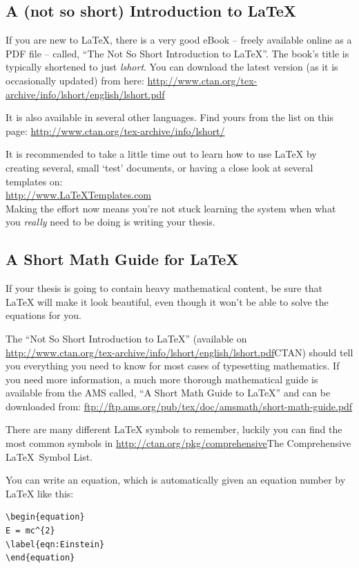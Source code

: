 \subsection{A (not so short) Introduction to \LaTeX{}}

If you are new to \LaTeX{}, there is a very good eBook -- freely available online as a PDF file -- called, \enquote{The Not So Short Introduction to \LaTeX{}}. The book's title is typically shortened to just \emph{lshort}. You can download the latest version (as it is occasionally updated) from here:
\url{http://www.ctan.org/tex-archive/info/lshort/english/lshort.pdf}

It is also available in several other languages. Find yours from the list on this page: \url{http://www.ctan.org/tex-archive/info/lshort/}

It is recommended to take a little time out to learn how to use \LaTeX{} by creating several, small `test' documents, or having a close look at several templates on:\\ 
\url{http://www.LaTeXTemplates.com}\\ 
Making the effort now means you're not stuck learning the system when what you \emph{really} need to be doing is writing your thesis.

\subsection{A Short Math Guide for \LaTeX{}}

If your thesis is going to contain heavy mathematical content, be sure that \LaTeX{} will make it look beautiful, even though it won't be able to solve the equations for you.

The \enquote{Not So Short Introduction to \LaTeX} (available on \url{http://www.ctan.org/tex-archive/info/lshort/english/lshort.pdf}{CTAN}) should tell you everything you need to know for most cases of typesetting mathematics. If you need more information, a much more thorough mathematical guide is available from the AMS called, \enquote{A Short Math Guide to \LaTeX} and can be downloaded from:
\url{ftp://ftp.ams.org/pub/tex/doc/amsmath/short-math-guide.pdf}

There are many different \LaTeX{} symbols to remember, luckily you can find the most common symbols in \url{http://ctan.org/pkg/comprehensive}{The Comprehensive \LaTeX~Symbol List}.

You can write an equation, which is automatically given an equation number by \LaTeX{} like this:
\begin{verbatim}
\begin{equation}
E = mc^{2}
\label{eqn:Einstein}
\end{equation}
\end{verbatim}

